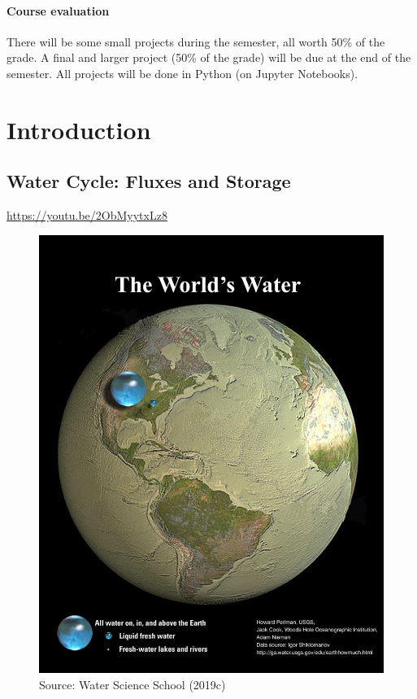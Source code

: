 \documentclass[
  letterpaper,
  DIV=11,
  numbers=noendperiod]{scrreprt}
\begin{document}
\hypertarget{course-evaluation}{%
\subsection*{Course evaluation}\label{course-evaluation}}

There will be some small projects during the semester, all worth 50\% of
the grade. A final and larger project (50\% of the grade) will be due at
the end of the semester. All projects will be done in Python (on Jupyter
Notebooks).

\part{Introduction}

\hypertarget{water-cycle-fluxes-and-storage}{%
\chapter{Water Cycle: Fluxes and
Storage}\label{water-cycle-fluxes-and-storage}}

\url{https://youtu.be/2ObMyytxLz8}

\begin{figure}

{\centering \includegraphics{archive/figures/all-the-worlds-water.jpg}

}

\caption{Source: Water Science School (2019c)}

\end{figure}
\end{document}

